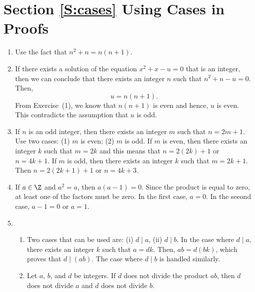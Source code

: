 \section*{Section \ref{S:cases} Using Cases in Proofs}

\begin{enumerate}
\item Use the fact that $n^2 + n = n \left( n+1 \right)$.


\item If there exists a  solution of the equation $x^2 + x - u = 0$ that is an integer, then we can conclude that there exists an integer $n$ such that $n^2 + n - u = 0$.  Then,
\[
u = n \left( n + 1 \right).
\]
From Exercise~(1), we know that $n(n + 1)$ is even and hence, $u$ is even.  This contradicts the assumption that $u$ is odd.


\item If $n$ is an odd integer, then there exists an integer $m$ such that $n = 2m + 1$.  Use two cases: (1) $m$ is even; (2) $m$ is odd.  If $m$ is even, then there exists an integer $k$ such that $m = 2k$ and this means that $n = 2(2k) + 1$ or $n = 4k + 1$.  If $m$ is odd, then there exists an integer $k$ such that $m = 2k + 1$.  Then $n = 2(2k + 1) + 1$ or $n = 4k + 3$.


\item If $a \in \Z$ and $a^2 = a$, then $a(a - 1) = 0$.  Since the product is equal to zero, at least one of the factors must be zero.  In the first case, $a = 0$.  In the second case, 
$a - 1 = 0$ or $a = 1$.


\item
\begin{enumerate}
\item Two cases that can be used are:  (i) $d \mid a$, (ii) $d \mid b$.  In the case where $d \mid a$, there exists an integer $k$ such that $a = dk$.  Then, $ab = d \left( bk \right)$, which proves that $d \mid \left( ab \right)$.  The case where $d \mid b$ is handled similarly.

\item Let $a$, $b$, and $d$ be integers.  If $d$ does not divide the product $ab$, then $d$ does not divide $a$ and $d$ does not divide $b$.


\end{enumerate}
\end{enumerate}
